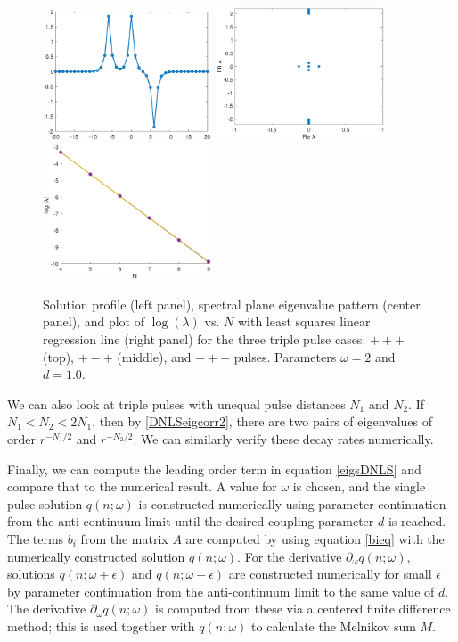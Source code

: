 \documentclass[thesis.tex]{subfiles}
\begin{document}
\begin{figure}
\includegraphics[width=5cm]{images/other/dnlsPPM.eps}
\includegraphics[width=5cm]{images/other/dnlsPPMeig.eps}
\includegraphics[width=5cm]{images/other/dnlsPPMdecay.eps}
\caption[Solutions and eigenvalue patterns for triple pulses in DNLS]{Solution profile (left panel), spectral plane eigenvalue pattern (center panel), and plot of $\log(\lambda)$ vs. $N$ with least squares linear regression line (right panel) for the three triple pulse cases: $+++$ (top), $+-+$ (middle), and $++-$ pulses. Parameters $\omega = 2$ and $d = 1.0$.}
\label{fig:eigendecay2}
\end{figure}

We can also look at triple pulses with unequal pulse distances $N_1$ and $N_2$. If $N_1 < N_2 < 2 N_1$, then by \cref{DNLSeigcorr2}, there are two pairs of eigenvalues of order $r^{-N_1/2}$ and $r^{-N_2/2}$. We can similarly verify these decay rates numerically.

Finally, we can compute the leading order term in equation \cref{eigsDNLS} and compare that to the numerical result. A value for $\omega$ is chosen, and the single pulse solution $q(n; \omega)$ is constructed numerically using parameter continuation from the anti-continuum limit until the desired coupling parameter $d$ is reached. The terms $b_i$ from the matrix $A$ are computed by using equation \cref{bieq} with the numerically constructed solution $q(n; \omega)$. For the derivative $\partial_\omega q(n; \omega)$, solutions $q(n; \omega + \epsilon)$ and $q(n; \omega - \epsilon)$ are constructed numerically for small $\epsilon$ by parameter continuation from the anti-continuum limit to the same value of $d$. The derivative $\partial_\omega q(n; \omega)$ is computed from these via a centered finite difference method; this is used together with $q(n; \omega)$ to calculate the Melnikov sum $M$. 
\end{document}
